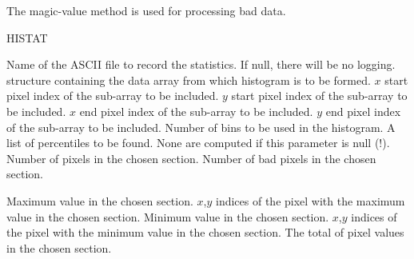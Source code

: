 {\begin{manroutinedescription}
  The magic-value method is used for processing bad data.

  HISTAT

\begin{manparametertable}
  Name of the ASCII file to record the statistics. If null,
  there will be no logging. {\mantt [!]}
  {} structure containing the data array from which
  histogram is to be formed.
  {$x$} start pixel index of the sub-array to be included.
  {$y$} start pixel index of the sub-array to be included.
  {$x$} end pixel index of the sub-array to be included.
  {$y$} end pixel index of the sub-array to be included.
  Number of bins to be used in the histogram. \mbox{\mantt [2048]}
{{}}
  A list of percentiles to be found. None are computed if this
  parameter is null (!). {\mantt [!]}
  Number of pixels in the chosen section.
  Number of bad pixels in the chosen section.
\end{manparametertable}
\begin{manparametertable}
  Maximum value in the chosen section.
  {$x$},{$y$} indices of the pixel with the maximum value in the chosen section.
  Minimum value in the chosen section.
  {$x$},{$y$} indices of the pixel with the minimum value in the chosen section.
  The total of pixel values in the chosen section.

\end{manparametertable}
\end{manroutinedescription}}
